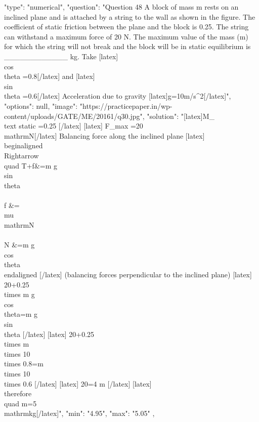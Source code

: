   {
    "type": "numerical",
    "question": "Question 48 A block of mass m rests on an inclined plane and is attached by a string to the wall as shown in the figure. The coefficient of static friction between the plane and the block is 0.25. The string can withstand a maximum force of 20 N. The maximum value of the mass (m) for which the string will not break and the block will be in static equilibrium is ____________ kg. Take [latex]\\cos\\theta =0.8[/latex]  and [latex]\\sin\\theta =0.6[/latex] Acceleration due to gravity [latex]g=10m/s^{2}[/latex]",
    "options": null,
    "image": "https://practicepaper.in/wp-content/uploads/GATE/ME/20161/q30.jpg",
    "solution": "[latex]M_{\\text {static }} =0.25 [/latex] [latex] F_{max} =20 \\mathrm{N}[/latex] Balancing force along the inclined plane [latex] \\begin{aligned} \\Rightarrow \\quad T+f&=m g \\sin \\theta \\\\ f &=\\mu \\mathrm{N} \\\\ N &=m g \\cos \\theta \\end{aligned} [/latex] (balancing forces perpendicular to the inclined plane) [latex] 20+0.25 \\times m g \\cos \\theta=m g \\sin \\theta [/latex] [latex] 20+0.25 \\times m \\times 10 \\times 0.8=m \\times 10 \\times 0.6 [/latex] [latex] 20=4 m [/latex] [latex] \\therefore \\quad m=5 \\mathrm{kg}[/latex]",
    "min": "4.95",
    "max": "5.05"
  },
